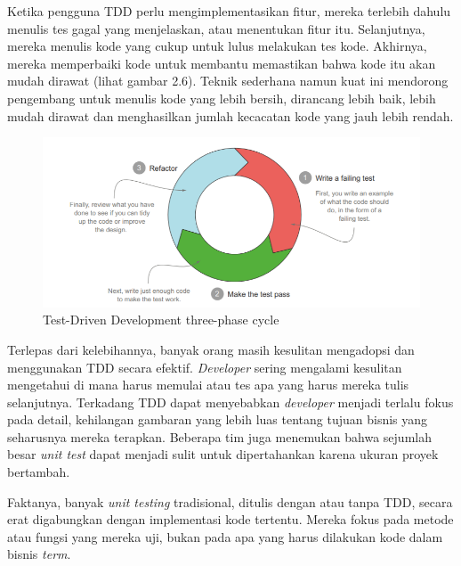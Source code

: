Ketika pengguna TDD perlu mengimplementasikan fitur, mereka terlebih dahulu menulis tes gagal yang menjelaskan, atau menentukan fitur itu. Selanjutnya, mereka menulis kode yang cukup untuk lulus melakukan tes kode. Akhirnya, mereka memperbaiki kode untuk membantu memastikan bahwa kode itu akan mudah dirawat (lihat gambar 2.6). Teknik sederhana namun kuat ini mendorong pengembang untuk menulis kode yang lebih bersih, dirancang lebih baik, lebih mudah dirawat dan menghasilkan jumlah kecacatan kode yang jauh lebih rendah.

\begin{figure}
	\includegraphics[scale=1.2]{gambar/bdd}
	\centering
	\caption{Test-Driven Development three-phase cycle}
\end{figure}
Terlepas dari kelebihannya, banyak orang masih kesulitan mengadopsi dan menggunakan TDD secara efektif. \textit{Developer} sering mengalami kesulitan mengetahui di mana harus memulai atau tes apa yang harus mereka tulis selanjutnya. Terkadang TDD dapat menyebabkan \textit{developer} menjadi terlalu fokus pada detail, kehilangan gambaran yang lebih luas tentang tujuan bisnis yang seharusnya mereka terapkan. Beberapa tim juga menemukan bahwa sejumlah besar \textit{unit test} dapat menjadi sulit untuk dipertahankan karena ukuran proyek bertambah.

Faktanya, banyak \textit{unit testing} tradisional, ditulis dengan atau tanpa TDD, secara erat digabungkan dengan implementasi kode tertentu. Mereka fokus pada metode atau fungsi yang mereka uji, bukan pada apa yang harus dilakukan kode dalam  bisnis \textit{term}.

